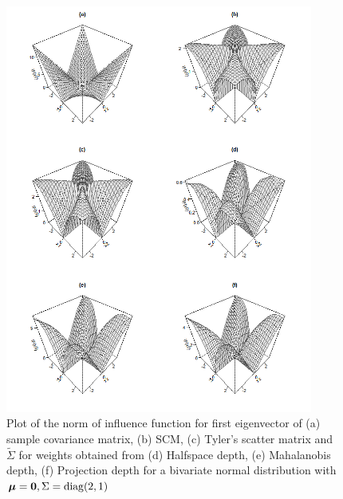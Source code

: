 \begin{figure}[t]
	\centering
		\includegraphics[width=0.9\textwidth]{IFnorm}
	\caption{Plot of the norm of influence function for first eigenvector of (a) sample 
	covariance matrix, (b) SCM, (c) Tyler's scatter matrix and $\tilde{\Sigma}$ for 
	weights obtained from (d) Halfspace depth, (e) Mahalanobis depth, (f) Projection depth 
	for a bivariate normal distribution with ${\boldsymbol{\mu}} = {\bf 0}, \Sigma = \operatorname*{diag}(2,1)$}
	\label{fig:IFnorm}
\end{figure}

